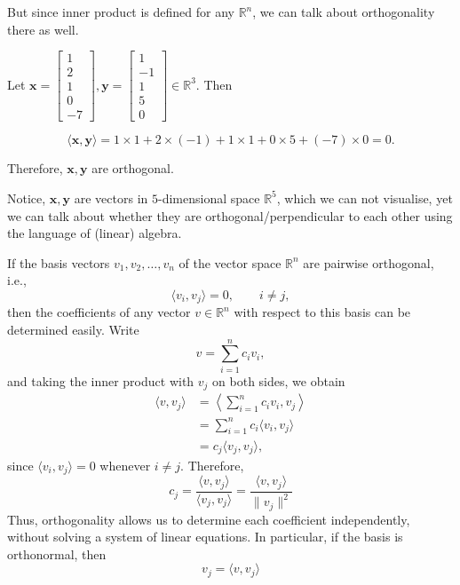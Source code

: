 But since inner product is defined for any \( \mathbb{R}^n \), we can talk about orthogonality there as well.

\begin{example}
	Let \( \mathbf{x} = \begin{bmatrix} 1 \\ 2 \\ 1 \\ 0 \\ -7 \end{bmatrix}, \mathbf{y} = \begin{bmatrix} 1 \\ -1 \\ 1 \\ 5 \\ 0 \end{bmatrix} \in \mathbb{R}^3 \). Then

	\begin{equation}
		\langle \mathbf{x}, \mathbf{y} \rangle = 1 \times 1 + 2 \times (-1) + 1 \times 1 + 0 \times 5 + (-7) \times 0 = 0.
		\label{eq:orthogonality-2.1}
	\end{equation}

	Therefore, \( \mathbf{x}, \mathbf{y} \) are orthogonal.

	Notice, \( \mathbf{x}, \mathbf{y} \) are vectors in \( 5 \)-dimensional space  \( \mathbb{R}^5 \), which we can not visualise, yet we can talk about whether they are orthogonal/perpendicular to each other using the language of (linear) algebra.
\end{example}

If the basis vectors $v_1,v_2,\ldots,v_n$ of the vector
space $\mathbb{R}^n$ are pairwise orthogonal, i.e.,
\begin{equation}
	\langle v_i,v_j\rangle=0,
	\qquad i\neq j,
	\label{eq:orthogonality-3}
\end{equation}
then the coefficients of any vector $v\in\mathbb{R}^n$
with respect to this basis can be determined easily.
Write
\begin{equation}
	v=\sum_{i=1}^{n}c_i v_i,
\end{equation}
and taking the inner product with $v_j$ on both sides,
we obtain
\begin{align}
	\langle v,v_j\rangle
	 & =\left\langle\sum_{i=1}^{n}c_i v_i,v_j\right\rangle \\
	 & =\sum_{i=1}^{n}c_i\langle v_i,v_j\rangle            \\
	 & =c_j\langle v_j,v_j\rangle,
\end{align}
since $\langle v_i,v_j\rangle=0$ whenever $i\neq j$.
Therefore,
\begin{equation}
	c_j=\frac{\langle v,v_j\rangle}
	{\langle v_j,v_j\rangle}
	=\frac{\langle v,v_j\rangle}{\|v_j\|^2}
	\label{eq:orthogonality-4}
\end{equation}
Thus, orthogonality allows us to determine each
coefficient independently, without solving a system
of linear equations. In particular, if the basis
is orthonormal, then
\begin{equation}
	v_j=\langle v,v_j\rangle
	\label{eq:orthogonality-5}
\end{equation}

